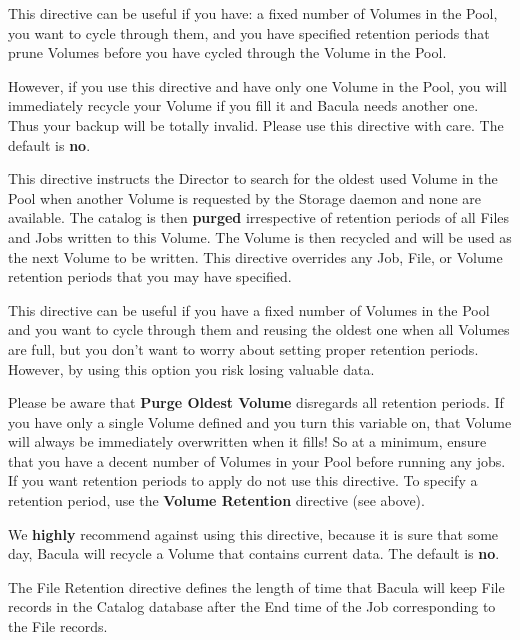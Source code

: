 \begin{description}
   This directive can be useful if you have: a fixed number of Volumes in
   the Pool, you want to cycle through them, and you have specified
   retention periods that prune Volumes before you have cycled through the
   Volume in the Pool.

   However, if you use this directive and have only one Volume in the Pool,
   you will immediately recycle your Volume if you fill it and Bacula needs
   another one.  Thus your backup will be totally invalid.  Please use this
   directive with care.  The default is {\bf no}.

\label{PurgeOldest}

\item [Purge Oldest Volume = \lt{}yes\vb{}no\gt{}]
   This directive instructs the Director to search for the oldest used
   Volume in the Pool when another Volume is requested by the Storage
   daemon and none are available.  The catalog is then {\bf purged}
   irrespective of retention periods of all Files and Jobs written to this
   Volume.  The Volume is then recycled and will be used as the next Volume
   to be written.  This directive overrides any Job, File, or Volume
   retention periods that you may have specified.

   This directive can be useful if you have a fixed number of Volumes in
   the Pool and you want to cycle through them and reusing the oldest one
   when all Volumes are full, but you don't want to worry about setting
   proper retention periods.  However, by using this option you risk losing
   valuable data.

   Please be aware that {\bf Purge Oldest Volume} disregards all retention
   periods. If you have only a single Volume defined and you turn this
   variable on, that Volume will always be immediately overwritten when it
   fills!  So at a minimum, ensure that you have a decent number of Volumes
   in your Pool before running any jobs.  If you want retention periods to
   apply do not use this directive.  To specify a retention period, use the
   {\bf Volume Retention} directive (see above).

   We {\bf highly} recommend against using this directive, because it is
   sure that some day, Bacula will recycle a Volume that contains current
   data.  The default is {\bf no}.

\item [File Retention = \lt{}time-period-specification\gt{}]
   The File Retention directive defines the length of time that  Bacula will
   keep File records in the Catalog database after the End time of the
   Job corresponding to the File records. 


\end{description}

